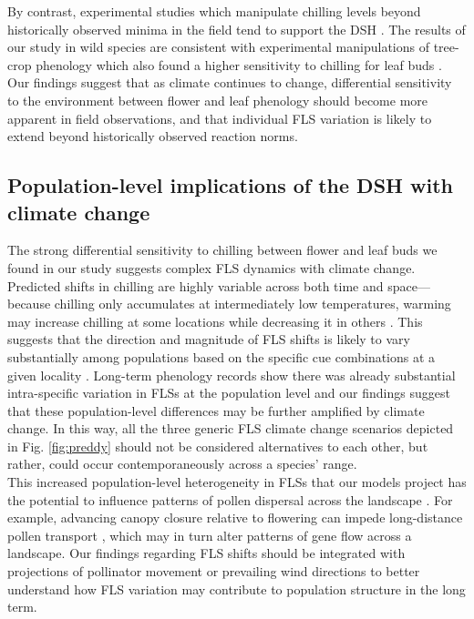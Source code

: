 \documentclass[11pt]{article}\usepackage[]{graphicx}\usepackage[]{color}
\begin{document}
\noindent By contrast, experimental studies which manipulate chilling levels beyond historically observed minima in the field tend to support the DSH \citep[e.g.][]{Aslani2009,Gariglio2006}. The results of our study in wild species are consistent with experimental manipulations of tree-crop phenology which also found a higher sensitivity to chilling for leaf buds \citep{Gariglio2006,Citadin2001}. Our findings suggest that as climate continues to change, differential sensitivity to the environment between flower and leaf phenology should become more apparent in field observations, and that individual FLS variation is likely to extend beyond historically observed reaction norms.\\

\subsection*{Population-level implications of the DSH with climate change}
\noindent The strong differential sensitivity to chilling between flower and leaf buds we found in our study suggests complex FLS dynamics with climate change. Predicted shifts in chilling are highly variable across both time and space---because chilling only accumulates at intermediately low temperatures, warming may increase chilling at some locations while decreasing it in others \citep{Man2017,Zhang:2007aa}. This suggests that the direction and magnitude of FLS shifts is likely to vary substantially among populations based on the specific cue combinations at a given locality \citep{Chmielewski:2012aa}. Long-term phenology records show there was already substantial intra-specific variation in FLSs at the population level \citep{Buonaiuto2020} and our findings suggest that these population-level differences may be further amplified by climate change. In this way, all the three generic FLS climate change scenarios depicted in Fig. \ref{fig:preddy} should not be considered alternatives to each other, but rather, could occur contemporaneously across a species' range. \\ 

\noindent This increased population-level heterogeneity in FLSs that our models project has the potential to influence patterns of pollen dispersal across the landscape \citep{Borycka2017,Pace:2018aa}. For example, advancing canopy closure relative to flowering can impede long-distance pollen transport \citep{Milleron2012}, which may in turn alter patterns of gene flow across a landscape. Our findings regarding FLS shifts should be integrated with projections of pollinator movement or prevailing wind directions \citep{Kling:2020aa} to better understand how FLS variation may contribute to population structure in the long term. \\
\end{document}
